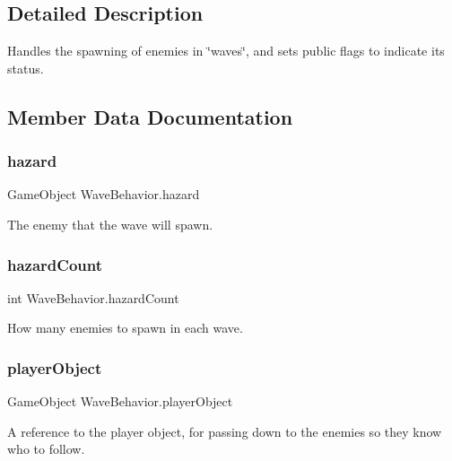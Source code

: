 \subsection{Detailed Description}
Handles the spawning of enemies in \char`\"{}waves\char`\"{}, and sets public flags to indicate its status. 

\subsection{Member Data Documentation}
\mbox{\label{class_wave_behavior_a6890b5a829fbd0d27517b75ab3e9fa12}} 
\subsubsection{\texorpdfstring{hazard}{hazard}}
{\footnotesize\ttfamily Game\+Object Wave\+Behavior.\+hazard}



The enemy that the wave will spawn. 

\mbox{\label{class_wave_behavior_a3790e0815c8d88a71e77e3227b050b42}} 
\subsubsection{\texorpdfstring{hazardCount}{hazardCount}}
{\footnotesize\ttfamily int Wave\+Behavior.\+hazard\+Count}



How many enemies to spawn in each wave. 

\mbox{\label{class_wave_behavior_a97c0d24bc7af3d86d245206339a04d1f}} 
\subsubsection{\texorpdfstring{playerObject}{playerObject}}
{\footnotesize\ttfamily Game\+Object Wave\+Behavior.\+player\+Object}



A reference to the player object, for passing down to the enemies so they know who to follow. 


